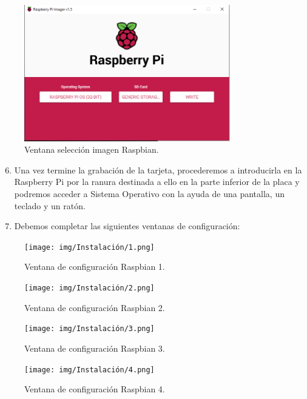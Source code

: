 \begin{figure}[h]
\centering
\includegraphics[width=0.8\textwidth]{img/fotos/flasheadoSDRbP.PNG}
\caption{Ventana selección imagen Raspbian.}\label{flasheadoSDRbP}
\end{figure}

\begin{enumerate}
\setcounter{enumi}{5}
    \item Una vez termine la grabación de la tarjeta, procederemos a introducirla en la Raspberry Pi por la ranura destinada a ello en la parte inferior de la placa y podremos acceder a Sistema Operativo con la ayuda de una pantalla, un teclado y un ratón.
    \item Debemos completar las siguientes ventanas de configuración:
\end{enumerate}

\begin{figure}[h]
\centering
\texttt{[image: img/Instalación/1.png]}
\caption{Ventana de configuración Raspbian 1.}\label{Instala1}
\end{figure}

\begin{figure}[h]
\centering
\texttt{[image: img/Instalación/2.png]}
\caption{Ventana de configuración Raspbian 2.}\label{Instala2}
\end{figure}

\begin{figure}[h]
\centering
\texttt{[image: img/Instalación/3.png]}
\caption{Ventana de configuración Raspbian 3.}\label{Instala3}
\end{figure}

\begin{figure}[h]
\centering
\texttt{[image: img/Instalación/4.png]}
\caption{Ventana de configuración Raspbian 4.}\label{Instala4}
\end{figure}

